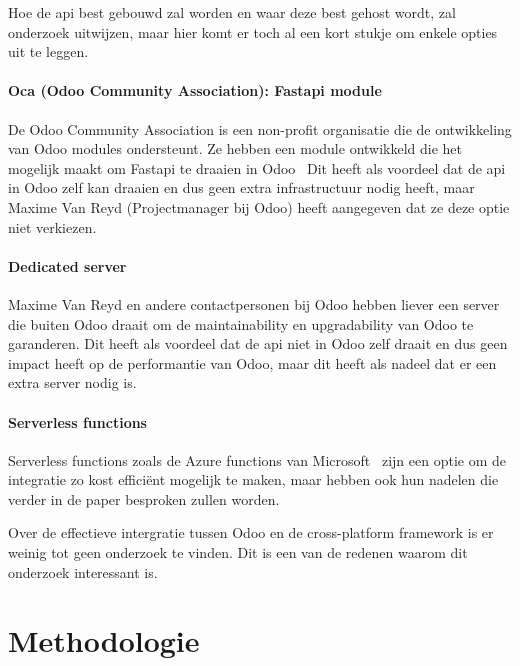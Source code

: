 Hoe de api best gebouwd zal worden en waar deze best gehost wordt, zal onderzoek uitwijzen, maar hier komt er toch al een kort stukje om enkele opties uit te leggen.

\paragraph*{Oca (Odoo Community Association): Fastapi module}
De Odoo Community Association is een non-profit organisatie die de ontwikkeling van Odoo modules ondersteunt.
Ze hebben een module ontwikkeld die het mogelijk maakt om Fastapi te draaien in Odoo~\autocite{ocaRestFramework2023}
Dit heeft als voordeel dat de api in Odoo zelf kan draaien en dus geen extra infrastructuur nodig heeft, 
maar Maxime Van Reyd (Projectmanager bij Odoo) heeft aangegeven dat ze deze optie niet verkiezen.

\paragraph*{Dedicated server}
Maxime Van Reyd en andere contactpersonen bij Odoo hebben liever een server die buiten Odoo draait om de maintainability en upgradability van Odoo te garanderen.
Dit heeft als voordeel dat de api niet in Odoo zelf draait en dus geen impact heeft op de performantie van Odoo, maar dit heeft als nadeel dat er een extra server nodig is.

\paragraph*{Serverless functions}
Serverless functions zoals de Azure functions van Microsoft~\autocite{Kurniawan2019} zijn een optie om de integratie zo kost efficiënt mogelijk te maken, 
maar hebben ook hun nadelen die verder in de paper besproken zullen worden.



Over de effectieve intergratie tussen Odoo en de cross-platform framework is er weinig tot geen onderzoek te vinden.
Dit is een van de redenen waarom dit onderzoek interessant is.

\section{Methodologie}%
\label{sec:methodologie}



